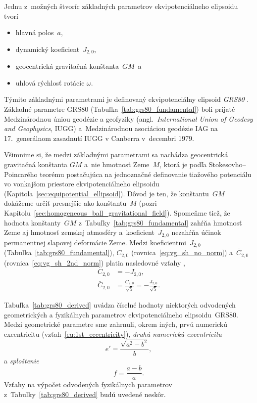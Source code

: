 \documentclass[a4paper, 12pt]{book}
\begin{document}
Jednu z~možných štvoríc základných parametrov ekvipotenciálneho elipsoidu tvorí
%
\begin{itemize}
\item hlavná polos~$a$,
%
\item dynamický koeficient~$J_{2,0}$,
%
\item geocentrická gravitačná konštanta~$GM$~a
%
\item uhlová rýchlosť rotácie $\omega$.
\end{itemize}
%
Týmito základnými parametrami je definovaný ekvipotenciálny elipsoid 
\emph{GRS80} \parencite[angl. \textit{Geodetic Reference 
System~1980};][]{GRS80}.  Základné parametre GRS80 
(Tabuľka~\ref{tab:grs80_fundamental}) boli prijaté Medzinárodnou úniou geodézie 
a geofyziky (angl.~\textit{International Union of Geodesy and Geophysics}, 
IUGG) a~Medzinárodnou asociáciou geodézie IAG na 17.~generálnom zasadnutí IUGG 
v Canberra v~decembri 1979.

Všimnime si, že medzi základnými parametrami sa nachádza geocentrická 
gravitačná konštanta $GM$ a~nie hmotnosť Zeme~$M$, ktorá je podľa 
Stokesovho--Poincarého teorému postačujúca na jednoznačné definovanie tiažového 
potenciálu vo vonkajšom priestore ekvipotenciálneho elipsoidu 
(Kapitola~\ref{sec:equipotential_ellipsoid}).  Dôvod je ten, že konštantu~$GM$ 
dokážeme určiť presnejšie ako konštantu~$M$ (pozri 
Kapitolu~\ref{sec:homogeneous_ball_gravitational_field}).  Spomeňme tiež, že 
hodnota konštanty~$GM$ z~Tabuľky~\ref{tab:grs80_fundamental} zahŕňa hmotnosť 
Zeme aj hmotnosť zemskej atmosféry a~koeficient~$J_{2,0}$ nezahŕňa účinok 
permanentnej slapovej deformácie Zeme.  Medzi koeficientmi~$J_{2,0}$ 
(Tabuľka~\ref{tab:grs80_fundamental}), $C_{2,0}$ 
(rovnica~\ref{eq:vg_sh_no_norm}) a~$\bar{C}_{2,0}$ 
(rovnica~\ref{eq:vg_sh_2nd_norm}) platia nasledovné vzťahy 
\parencite{Moritz1967,MoritzPhysicalGeodesy},
%
\begin{align}
\label{eq:c20_j20}
C_{2,0} &= -J_{2,0}{,}\\
%
\label{eq:c20_j20_2}
\bar{C}_{2,0} &= \frac{C_{2,0}}{\sqrt{5}} = -\frac{J_{2,0}}{\sqrt{5}}{.}
\end{align}

Tabuľka~\ref{tab:grs80_derived} uvádza číselné hodnoty niektorých odvodených 
geometrických a fyzikálnych parametrov ekvipotenciálneho elipsoidu~GRS80.  
Medzi geometrické parametre sme zahrnuli, okrem iných, prvú numerickú 
excentricitu (vzťah~\ref{eq:1st_eccentricity}), \emph{druhú numerickú 
excentricitu}
%
\begin{equation}
\label{eq:2nd_eccentricity}
e' = \frac{\sqrt{a^2 - b^2}}{b}{,}
\end{equation}
%
a \emph{sploštenie}
%
\begin{equation}
\label{eq:flattening}
f = \frac{a - b}{a}{.}
\end{equation}
%
Vzťahy na výpočet odvodených fyzikálnych parametrov 
z~Tabuľky~\ref{tab:grs80_derived} budú uvedené neskôr.
\end{document}
